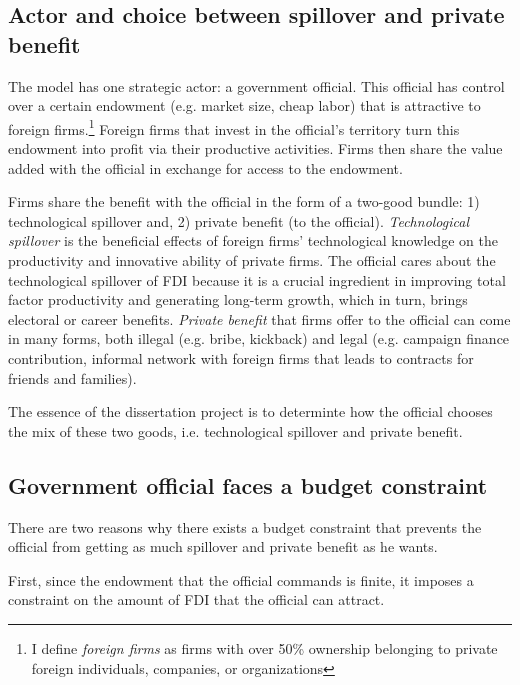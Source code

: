 \subsection{Actor and choice between spillover and private benefit}

The model has one strategic actor: a government official. This official has control over a certain endowment (e.g. market size, cheap labor) that is attractive to foreign firms.\footnote{I define  \textit{foreign firms} as firms with over 50\% ownership belonging to private foreign individuals, companies, or organizations} Foreign firms that invest in the official's territory turn this endowment into profit via their productive activities. Firms then share the value added with the official in exchange for access to the endowment. 

Firms share the benefit with the official in the form of a two-good bundle: 1) technological spillover and, 2) private benefit (to the official). \textit{Technological spillover} is the beneficial effects of foreign firms' technological knowledge on the productivity and innovative ability of private firms. The official cares about the technological spillover of FDI because it is a crucial ingredient in improving total factor productivity and generating long-term growth, which in turn, brings electoral or career benefits. \textit{Private benefit} that firms offer to the official can come in many forms, both illegal (e.g. bribe, kickback) and legal (e.g. campaign finance contribution, informal network with foreign firms that leads to contracts for friends and families).

The essence of the dissertation project is to determinte how the official chooses the mix of these two goods, i.e. technological spillover and private benefit.

\subsection{Government official faces a budget constraint}

There are two reasons why there exists a budget constraint that prevents the official from getting as much spillover and private benefit as he wants.

First, since the endowment that the official commands is finite, it imposes a constraint on the amount of FDI that the official can attract.

